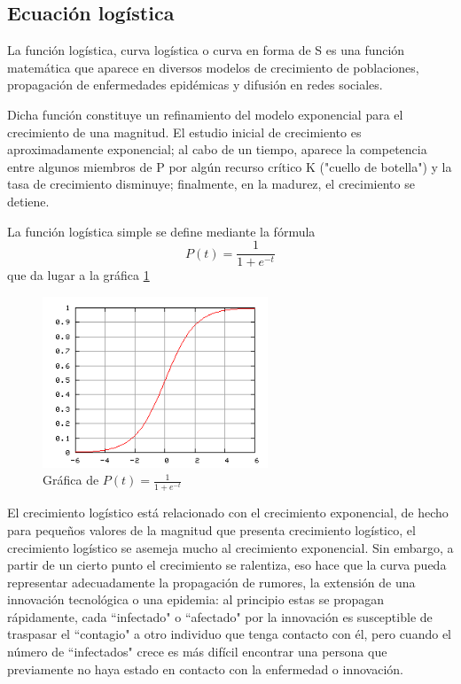 \subsection{Ecuación logística}
\begin{definition}
La función logística, curva logística o curva en forma de S es una función matemática que aparece en diversos modelos de crecimiento de poblaciones, propagación de enfermedades epidémicas y difusión en redes sociales.

Dicha función constituye un refinamiento del modelo exponencial para el crecimiento de una magnitud.
El estudio inicial de crecimiento es aproximadamente exponencial; al cabo de un tiempo, aparece la competencia entre algunos miembros de P por algún recurso crítico K ("cuello de botella") y la tasa de crecimiento disminuye; finalmente, en la madurez, el crecimiento se detiene.
\end{definition}

La función logística simple se define mediante la fórmula
\[P(t) = \frac{1}{1+e^{-t}}\]
que da lugar a la gráfica \ref{fig:EcLogistica}

\begin{figure}[hbtp]
\centering
\includegraphics[width = 0.6\textwidth]{img/EcuacionLogistica.png}
\caption{Gráfica de $P(t) = \frac{1}{1+e^{-t}}$}
\label{fig:EcLogistica}
\end{figure}


El crecimiento logístico está relacionado con el crecimiento exponencial, de hecho para pequeños valores de la magnitud que presenta crecimiento logístico, el crecimiento logístico se asemeja mucho al crecimiento exponencial. Sin embargo, a partir de un cierto punto el crecimiento se ralentiza, eso hace que la curva pueda representar adecuadamente la propagación de rumores, la extensión de una innovación tecnológica o una epidemia: al principio estas se propagan rápidamente, cada ``infectado" o ``afectado" por la innovación es susceptible de traspasar el ``contagio" a otro individuo que tenga contacto con él, pero cuando el número de ``infectados" crece es más difícil encontrar una persona que previamente no haya estado en contacto con la enfermedad o innovación.

